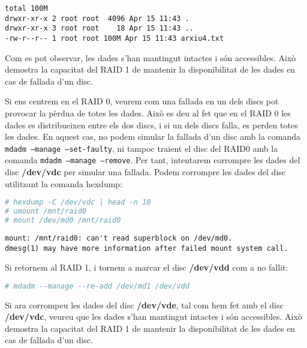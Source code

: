 \begin{terminaloutput}
\footnotesize\begin{verbatim}
total 100M
drwxr-xr-x 2 root root  4096 Apr 15 11:43 .
drwxr-xr-x 3 root root    18 Apr 15 11:43 ..
-rw-r--r-- 1 root root 100M Apr 15 11:43 arxiu4.txt
\end{verbatim}
\end{terminaloutput}

Com es pot observar, les dades s'han mantingut intactes i són accessibles. Això demostra la capacitat del RAID 1 de mantenir la disponibilitat de les dades en cas de fallada d'un disc.

Si ens centrem en el RAID 0, veurem com una fallada en un dels discs pot provocar la pèrdua de totes les dades. Això es deu al fet que en el RAID 0 les dades es distribueixen entre els dos discs, i si un dels discs falla, es perden totes les dades. En aquest cas, no podem simular la fallada d'un disc amb la comanda \texttt{mdadm --manage --set-faulty}, ni tampoc traient el disc del RAID0 amb la comanda \texttt{mdadm --manage --remove}. Per tant, intentarem corrompre les dades del disc \textbf{/dev/vdc} per simular una fallada. Podem corrompre les dades del disc utilitzant la comanda hexdump:

\begin{lstlisting}[language=bash, numbers=none, commentstyle=\color{black}]
# hexdump -C /dev/vdc | head -n 10
# umount /mnt/raid0
# mount /dev/md0 /mnt/raid0
\end{lstlisting}

\begin{terminaloutput}
\footnotesize\begin{verbatim}
mount: /mnt/raid0: can't read superblock on /dev/md0.
dmesg(1) may have more information after failed mount system call.
\end{verbatim}
\end{terminaloutput}

Si retornem al RAID 1, i tornem a marcar el disc \textbf{/dev/vdd} com a no fallit:

\begin{lstlisting}[language=bash, numbers=none, commentstyle=\color{black}]
# mdadm --manage --re-add /dev/md1 /dev/vdd
\end{lstlisting}

\begin{info}
Si ara corrompeu les dades del disc \textbf{/dev/vde}, tal com hem fet amb el disc \textbf{/dev/vdc}, veureu que les dades s'han mantingut intactes i són accessibles. Això demostra la capacitat del RAID 1 de mantenir la disponibilitat de les dades en cas de fallada d'un disc.
\end{info}

